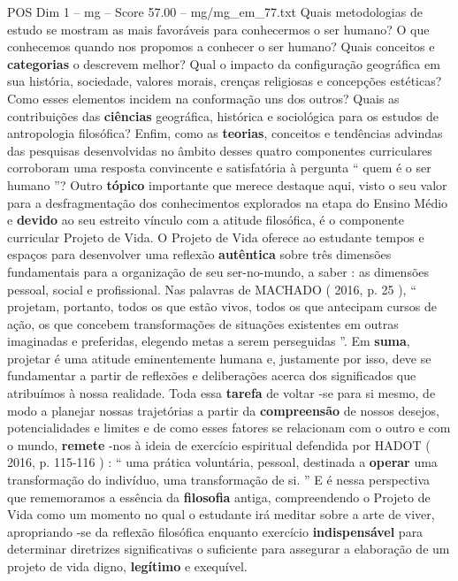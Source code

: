 \begin{textsample}{POS Dim 1 – mg – Score 57.00 – mg/mg\_em\_77.txt}
Quais metodologias de estudo se mostram as mais favoráveis para conhecermos o ser humano?
O que conhecemos quando nos propomos a conhecer o ser humano?
Quais conceitos e \textbf{categorias} o descrevem melhor?
Qual o impacto da configuração geográfica em sua história, sociedade, valores morais, crenças religiosas e concepções estéticas?
Como esses elementos incidem na conformação uns dos outros?
Quais as contribuições das \textbf{ciências} geográfica, histórica e sociológica para os estudos de antropologia filosófica?
Enfim, como as \textbf{teorias}, conceitos e tendências advindas das pesquisas desenvolvidas no âmbito desses quatro componentes curriculares corroboram uma resposta convincente e satisfatória à pergunta “ quem é o ser humano ”?
Outro \textbf{tópico} importante que merece destaque aqui, visto o seu valor para a desfragmentação dos conhecimentos explorados na etapa do Ensino Médio e \textbf{devido} ao seu estreito vínculo com a atitude filosófica, é o componente curricular Projeto de Vida.
O Projeto de Vida oferece ao estudante tempos e espaços para desenvolver uma reflexão \textbf{autêntica} sobre três dimensões fundamentais para a organização de seu ser-no-mundo, a saber : as dimensões pessoal, social e profissional.
Nas palavras de MACHADO ( 2016, p. 25 ), “ projetam, portanto, todos os que estão vivos, todos os que antecipam cursos de ação, os que concebem transformações de situações existentes em outras imaginadas e preferidas, elegendo metas a serem perseguidas ”.
Em \textbf{suma}, projetar é uma atitude eminentemente humana e, justamente por isso, deve se fundamentar a partir de reflexões e deliberações acerca dos significados que atribuímos à nossa realidade.
Toda essa \textbf{tarefa} de voltar -se para si mesmo, de modo a planejar nossas trajetórias a partir da \textbf{compreensão} de nossos desejos, potencialidades e limites e de como esses fatores se relacionam com o outro e com o mundo, \textbf{remete} -nos à ideia de exercício espiritual defendida por HADOT ( 2016, p. 115-116 ) : “ uma prática voluntária, pessoal, destinada a \textbf{operar} uma transformação do indivíduo, uma transformação de si. ” E é nessa perspectiva que rememoramos a essência da \textbf{filosofia} antiga, compreendendo o Projeto de Vida como um momento no qual o estudante irá meditar sobre a arte de viver, apropriando -se da reflexão filosófica enquanto exercício \textbf{indispensável} para determinar diretrizes significativas o suficiente para assegurar a elaboração de um projeto de vida digno, \textbf{legítimo} e exequível.

\end{textsample}
